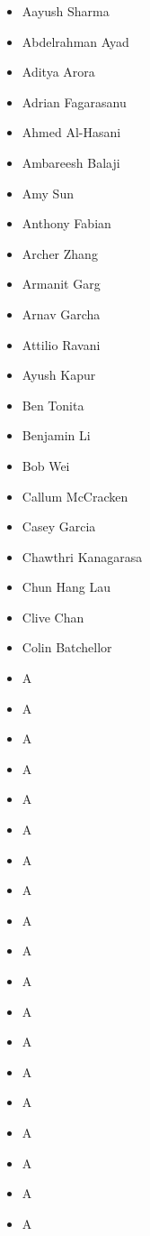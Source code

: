 \documentclass[main.tex]{subfiles}
\begin{document}
\begin{multicols}{4}
 \begin{itemize}[label={},noitemsep]
     \item {Aayush Sharma}
     \item {Abdelrahman Ayad}
     \item {Aditya Arora}
     \item {Adrian Fagarasanu}
     \item {Ahmed Al-Hasani}
	 \item {Ambareesh Balaji}
     \item {Amy Sun}
	 \item {Anthony Fabian}
     \item {Archer Zhang}
	 \item {Armanit Garg}
     \item {Arnav Garcha}
	 \item {Attilio Ravani}
     \item {Ayush Kapur}
	 \item {Ben Tonita}
     \item {Benjamin Li}
	 \item {Bob Wei}
     \item {Callum McCracken}
	 \item {Casey Garcia}
     \item {Chawthri Kanagarasa}
	 \item {Chun Hang Lau}
     \item {Clive Chan}
	 \item {Colin Batchellor}
     \item {A}
	 \item {A}
     \item {A}
	 \item {A}
     \item {A}
	 \item {A}
     \item {A}
	 \item {A}
     \item {A}
	 \item {A}
     \item {A}
	 \item {A}
     \item {A}
	 \item {A}
     \item {A}
	 \item {A}
     \item {A}
	 \item {A}
     \item {A}

\end{itemize}
\end{multicols}
\end{document}
